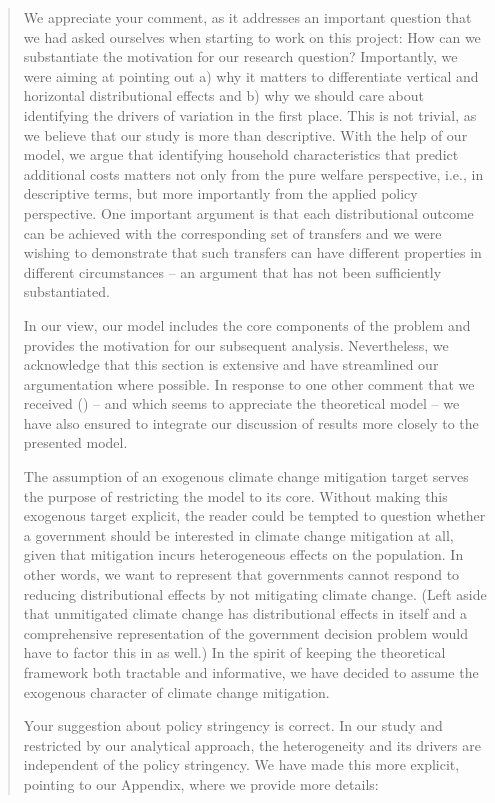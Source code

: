 \documentclass[11pt]{article}
\newenvironment{response}
{\begin{quote}\color{black}}
{\end{quote}}
\begin{document}
\begin{response}

We appreciate your comment, as it addresses an important question that we had asked ourselves when starting to work on this project: How can we substantiate the motivation for our research question? Importantly, we were aiming at pointing out a) why it matters to differentiate vertical and horizontal distributional effects and b) why we should care about identifying the drivers of variation in the first place. This is not trivial, as we believe that our study is more than descriptive. With the help of our model, we argue that identifying household characteristics that predict additional costs matters not only from the pure welfare perspective, i.e., in descriptive terms, but more importantly from the applied policy perspective. One important argument is that each distributional outcome can be achieved with the corresponding set of transfers and we were wishing to demonstrate that such transfers can have different properties in different circumstances -- an argument that has not been sufficiently substantiated. 

In our view, our model includes the core components of the problem and provides the motivation for our subsequent analysis. Nevertheless, we acknowledge that this section is extensive and have streamlined our argumentation where possible. In response to one other comment that we received () -- and which seems to appreciate the theoretical model -- we have also ensured to integrate our discussion of results more closely to the presented model.

The assumption of an exogenous climate change mitigation target serves the purpose of restricting the model to its core. Without making this exogenous target explicit, the reader could be tempted to question whether a government should be interested in climate change mitigation at all, given that mitigation incurs heterogeneous effects on the population. In other words, we want to represent that governments cannot respond to reducing distributional effects by not mitigating climate change. (Left aside that unmitigated climate change has distributional effects in itself and a comprehensive representation of the government decision problem would have to factor this in as well.) In the spirit of keeping the theoretical framework both tractable and informative, we have decided to assume the exogenous character of climate change mitigation.

Your suggestion about policy stringency is correct. In our study and restricted by our analytical approach, the heterogeneity and its drivers are independent of the policy stringency. We have made this more explicit, pointing to our Appendix, where we provide more details:

\end{response}
\end{document}
